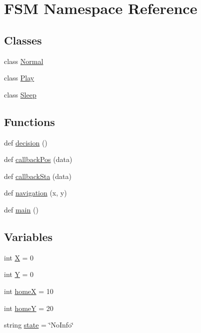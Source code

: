 \hypertarget{namespaceFSM}{}\section{F\+SM Namespace Reference}
\label{namespaceFSM}
\subsection*{Classes}
\begin{DoxyCompactItemize}
\item 
class \hyperlink{classFSM_1_1Normal}{Normal}
\item 
class \hyperlink{classFSM_1_1Play}{Play}
\item 
class \hyperlink{classFSM_1_1Sleep}{Sleep}
\end{DoxyCompactItemize}
\subsection*{Functions}
\begin{DoxyCompactItemize}
\item 
def \hyperlink{namespaceFSM_af260b27c59635079f8b07d91369570b5}{decision} ()
\item 
def \hyperlink{namespaceFSM_a4f42463821520598ea44b0ae6acfc327}{callback\+Pos} (data)
\item 
def \hyperlink{namespaceFSM_a3f1960947f6a0dbcf41a5a97e18876b0}{callback\+Sta} (data)
\item 
def \hyperlink{namespaceFSM_abb847a793996f13624334054ad5eb37c}{navigation} (x, y)
\item 
def \hyperlink{namespaceFSM_acc99b577ee61be1b7cc0e2baae140224}{main} ()
\end{DoxyCompactItemize}
\subsection*{Variables}
\begin{DoxyCompactItemize}
\item 
int \hyperlink{namespaceFSM_ad4b9b754f58d2d256867e34136aa3563}{X} = 0
\item 
int \hyperlink{namespaceFSM_a90bf96bcb08f06c46475422464d23e6e}{Y} = 0
\item 
int \hyperlink{namespaceFSM_a303869c19d8cb03e8739fc96ee328259}{homeX} = 10
\item 
int \hyperlink{namespaceFSM_ae958f81bf7ca765a61e10c9bfa94ccdb}{homeY} = 20
\item 
string \hyperlink{namespaceFSM_a219d5c5ac08bd4c51a0f20bd27482dee}{state} = \char`\"{}No\+Info\char`\"{}
\end{DoxyCompactItemize}


